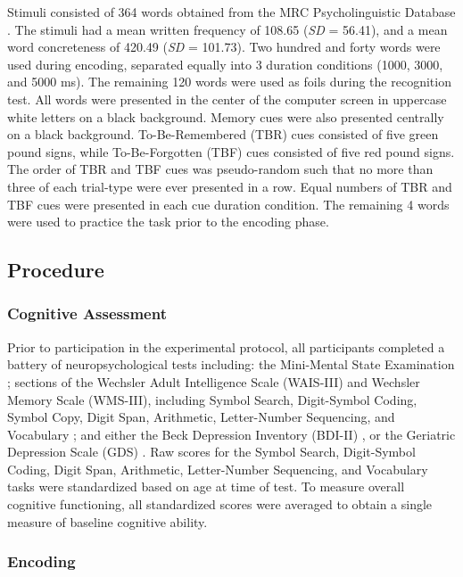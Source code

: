 \documentclass[man]{apa6}\usepackage[]{graphicx}\usepackage[]{color}
\begin{document}
Stimuli consisted of 364 words obtained from the MRC Psycholinguistic Database \parencite{coltheart1981}. The stimuli had a mean \textcite[]{kuvcera.nelson1967} written frequency of 108.65 (\textit{SD} = 56.41), and a mean word concreteness \parencite{spreen.schulz1966,gilhooly.logie1980} of 420.49 (\textit{SD} = 101.73). Two hundred and forty words were used during encoding, separated equally into 3 duration conditions (1000, 3000, and 5000 ms). The remaining 120 words were used as foils during the recognition test. All words were presented in the center of the computer screen in uppercase white letters on a black background. Memory cues were also presented centrally on a black background. To-Be-Remembered (TBR) cues consisted of five green pound signs, while To-Be-Forgotten (TBF) cues consisted of five red pound signs. The order of TBR and TBF cues was pseudo-random such that no more than three of each trial-type were ever presented in a row. Equal numbers of TBR and TBF cues were presented in each cue duration condition. The remaining 4 words were used to practice the task prior to the encoding phase.

\subsection*{Procedure}

\subsubsection*{Cognitive Assessment}

Prior to participation in the experimental protocol, all participants completed a battery of neuropsychological tests including: the Mini-Mental State Examination \parencite{folstein.robins.helzer1983mmse}; sections of the Wechsler Adult Intelligence Scale (WAIS-III) and Wechsler Memory Scale (WMS-III), including Symbol Search, Digit-Symbol Coding, Symbol Copy, Digit Span, Arithmetic, Letter-Number Sequencing, and Vocabulary \parencite{wais2008}; and either the Beck Depression Inventory (BDI-II) \parencite{beck.et.al.1996bdi}, or the Geriatric Depression Scale (GDS) \parencite{yesavage.sheikh1986gds}. Raw scores for the Symbol Search, Digit-Symbol Coding, Digit Span, Arithmetic, Letter-Number Sequencing, and Vocabulary tasks were standardized based on age at time of test. To measure overall cognitive functioning, all standardized scores were averaged to obtain a single measure of baseline cognitive ability.

\subsubsection*{Encoding}
\end{document}
